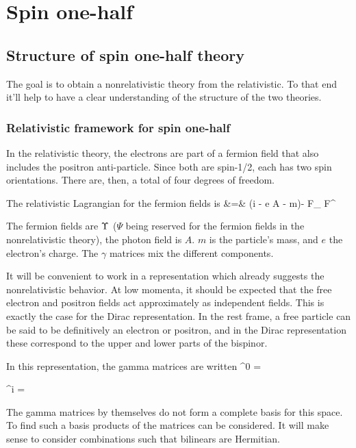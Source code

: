 \tableofcontents

\chapter{Spin one-half}

\section{Structure of spin one-half theory}

The goal is to obtain a nonrelativistic theory from the relativistic.  To that end it'll help to have a clear understanding of the structure of the two theories.

\subsection{Relativistic framework for spin one-half}
In the relativistic theory, the electrons are part of a fermion field that also includes the positron anti-particle.  Since both are spin-1/2, each has two spin orientations.  There are, then, a total of four degrees of freedom. 

The relativistic Lagrangian for the fermion fields is
\beqa
{} &=&	
	\Psigbar(i \partial \cdot \gamma - e A \cdot \gamma - m)\Psig  -  F_{\mu\nu} F^{\mu\nu}
\eeqa

The fermion fields are $\Upsilon$ ($\Psi$ being reserved for the fermion fields in the nonrelativistic theory), the photon field is $A$.   $m$ is the particle's mass, and $e$ the electron's charge.  The $\gamma$ matrices mix the different components.  %

It will be convenient to work in a representation which already suggests the nonrelativistic behavior.  At low momenta, it should be expected that the free electron and positron fields act approximately as independent fields.  This is exactly the case for the Dirac representation.   In the rest frame, a free particle can be said to be definitively an electron or positron, and in the Dirac representation these correspond to the upper and lower parts of the bispinor.  

In this representation, the gamma matrices are written
\beq
	\gamma^0 = 
\eeq

\beq
	\gamma^i = 
\eeq	




The gamma matrices by themselves do not form a complete basis for this space.  To find such a basis products of the matrices can be considered.  It will make sense to consider combinations such that bilinears are Hermitian.  
 

